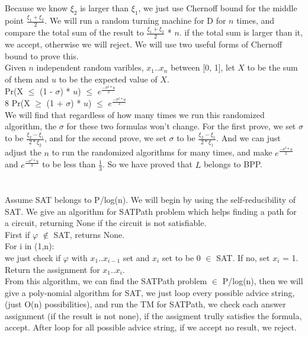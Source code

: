 \documentclass[11pt]{article}
\begin{document}
\part{} 
Because we know $\xi_{2}$ is larger than $\xi_{1}$, we just use Chernoff bound for the middle point $\frac{\xi_{1} + \xi_{2}}{2}$.
We will run a random turning machine for D for $n$ times, and compare the total sum of the result to $\frac{\xi_{1} + \xi_{2}}{2}$ * $n$. if the total sum is larger than it, we accept, otherwise we will reject. We will use two useful forms of Chernoff bound to prove this. \\
Given $n$ independent random varibles, $x_{1}$..$x_{n}$ between [0, 1], let $X$ to be the sum of them and $u$ to be the expected value of $X$. \\
Pr(X $\leq$ (1 - $\sigma$) * $u$) $\leq$ $e^{\frac{-\sigma^{2}*u}{2}}$ \\8
Pr(X $\geq$ (1 + $\sigma$) * $u$) $\leq$ $e^{\frac{-\sigma^{2}*u}{3}}$ \\
We will find that regardless of how many times we run this randomized algorithm, the $\sigma$ for these two formulas won't change. For the first prove, we set $\sigma$ to be $\frac{\xi_{2} - \xi_{1}}{2*\xi_{2}}$, and for the second prove, we set $\sigma$ to be $\frac{\xi_{2} - \xi_{1}}{2*\xi_{1}}$. And we can just adjust the $n$ to run the randomized algorithms for many times, and make $e^{\frac{-\sigma^{2}*u}{2}}$ and $e^{\frac{-\sigma^{2}*u}{3}}$ to be less than $\frac{1}{3}$. So we have proved that $L$ belongs to BPP.
\part{}
Assume SAT belongs to P/log(n). We will begin by using the self-reducibility of SAT. We give an algorithm for SATPath problem which helps finding a path for a circuit, returning None if the circuit is not satisfiable.\\
First if $\varphi$ $\notin$ SAT, returns None. \\
For i in (1,n): \\
	we just check if $\varphi$ with $x_{1}..x_{i-1}$ set and $x_{i}$ set to be 0 $\in$ SAT. If no, set $x_{i}$ = 1. \\
Return the assignment for $x_{1}..x_{i}$. \\
From this algorithm, we can find the SATPath problem $\in$ P/log(n), then we will give a poly-nomial algorithm for SAT, we just loop every possible advice string, (just O(n) possibilities), and run the TM for SATPath, we check each answer assignment (if the result is not none), if the assigment trully satisfies the formula, accept. After loop for all possible advice string, if we accept no result, we reject.
\end{document}
